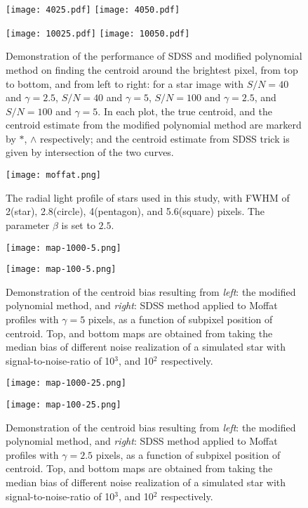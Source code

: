 \documentclass[12pt, preprint]{aastex}
\begin{document}
\begin{figure}[!htb]
  \texttt{[image: 4025.pdf]}
\endminipage
{}
  \texttt{[image: 4050.pdf]}
\endminipage

  \texttt{[image: 10025.pdf]}
\endminipage
{}
  \texttt{[image: 10050.pdf]}
\endminipage
\caption{Demonstration of the performance of SDSS and modified polynomial method on finding the centroid around the brightest pixel, from top to bottom, and from left to right: for a star image with $S/N=40$ and $\gamma = 2.5$, $S/N=40$ and $\gamma = 5$, $S/N=100$ and $\gamma = 2.5$, and $S/N=100$ and $\gamma = 5$. In each plot, the true centroid, and the centroid estimate from the modified polynomial method are markerd by $*$, $\wedge$ respectively; and the centroid estimate from SDSS trick is given by intersection of the two curves.}\label{ex}
\end{figure}


\begin{figure}[!htb]
  \texttt{[image: moffat.png]}
\endminipage
\caption{The radial light profile of stars used in this study, with FWHM of 2(star), 2.8(circle), 4(pentagon), and 5.6(square) pixels. The parameter $\beta$ is set to $2.5$.}\label{moffat}
\end{figure}

\begin{figure}[!htb]
\texttt{[image: map-1000-5.png]}
\endminipage

\texttt{[image: map-100-5.png]}
\endminipage
\caption{Demonstration of the centroid bias resulting from \emph{left}: the modified polynomial method, and \emph{right}: SDSS method applied to Moffat profiles with $\gamma=5$ pixels, as a function of subpixel position of centroid. Top, and bottom maps are obtained from taking the median bias of different noise realization of a simulated star with signal-to-noise-ratio of 10$^{3}$, and 10$^{2}$ respectively.}\label{map}
\end{figure}

\begin{figure}[!htb]
  \texttt{[image: map-1000-25.png]}
\endminipage

  \texttt{[image: map-100-25.png]}
\endminipage
\caption{Demonstration of the centroid bias resulting from \emph{left}: the modified polynomial method, and \emph{right}: SDSS method applied to Moffat profiles with $\gamma=2.5$ pixels, as a function of subpixel position of centroid. Top, and bottom maps are obtained from taking the median bias of different noise realization of a simulated star with signal-to-noise-ratio of 10$^{3}$, and 10$^{2}$ respectively.}\label{map}
\end{figure}
\end{document}
